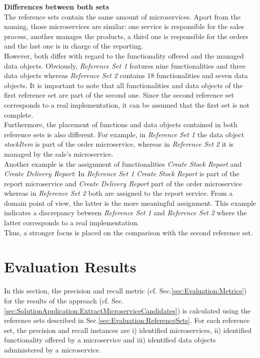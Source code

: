\noindent
\textbf{Differences between both sets} \\
The reference sets contain the same amount of microservices. Apart from the naming, those microservices are similar: one service is responsible for the sales process, another manages the products, a third one is responsible for the orders and the last one is in charge of the reporting. \\
However, both differ with regard to the functionality offered and the managed data objects. Obviously, \textit{Reference Set 1} features nine functionalities and three data objects whereas \textit{Reference Set 2} contains 18 functionalities and seven data objects. It is important to note that all functionalities and data objects of the first reference set are part of the second one. Since the second reference set corresponds to a real implementation, it can be assumed that the first set is not complete.\\
Furthermore, the placement of functions and data objects contained in both reference sets is also different. For example, in \textit{Reference Set 1} the data object \textit{stockItem} is part of the order microservice, whereas in \textit{Reference Set 2} it is managed by the sale's microservice.\\
Another example is the assignment of functionalities \textit{Create Stock Report}  and \textit{Create Delivery Report}: In \textit{Reference Set 1} \textit{Create Stock Report}  is part of the report microservice and \textit{Create Delivery Report} part of the order microservice whereas in \textit{Reference Set 2} both are assigned to the report service. From a domain point of view, the latter is the more meaningful assignment. This example indicates a discrepancy between \textit{Reference Set 1} and \textit{Reference Set 2} where the latter corresponds to a real implementation. \\
Thus, a stronger focus is placed on the comparison with the second reference set.




\section{Evaluation Results}
\label{sec:Evalutation:PrecisionAndRecallMeasurement}
In this section, the precision and recall metric (cf. Sec.\ref{sec:Evaluation:Metrics}) for the results of the approach (cf. Sec.\ref{sec:SolutionApplication:ExtractMicroserviceCandidates}) is calculated using the reference sets described in Sec.\ref{sec:Evaluation:ReferenceSets}. 
For each reference set, the precision and recall instances are i) identified microservices, ii) identified functionality offered by a microservice and iii) identified data objects administered by a microservice. 

